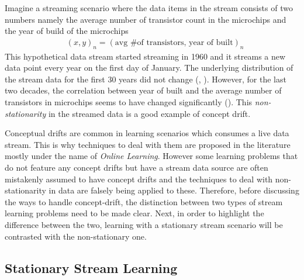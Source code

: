 {\begin{ex}
Imagine a streaming scenario where the data items in the stream consists of two numbers namely the average number of transistor count in the microchips and the year of build of the microchips\begin{align*}
& (x,y)_n = {(\text{avg \# of transistors, year of built})_n}
\end{align*}
This hypothetical data stream started streaming in 1960 and it streams a new data point every year on the first day of January. The underlying distribution of the stream data for the first 30 years did not change (\cite{moore_cramming_1965}, \cite{schaller_moores_1997}). However, for the last two decades, the correlation between year of built and the average number of transistors in microchips seems to have changed significantly (\cite{tuomi_lives_2002}). This \textit{non-stationarity} in the streamed data is a good example of concept drift.
\end{ex}

Conceptual drifts are common in learning scenarios which consumes a live data stream. This is why techniques to deal with them are proposed in the literature mostly under the name of \textit{Online Learning}. However some learning problems that do not feature any concept drifts but have a stream data source are often mistakenly assumed to have concept drifts and the techniques to deal with non-stationarity in data are falsely being applied to these. Therefore, before discussing the ways to handle concept-drift, the distinction between two types of stream learning problems need to be made clear. Next, in order to highlight the difference between the two, learning with a stationary stream scenario will be contrasted with the non-stationary one.

\subsection{Stationary Stream Learning}

}
